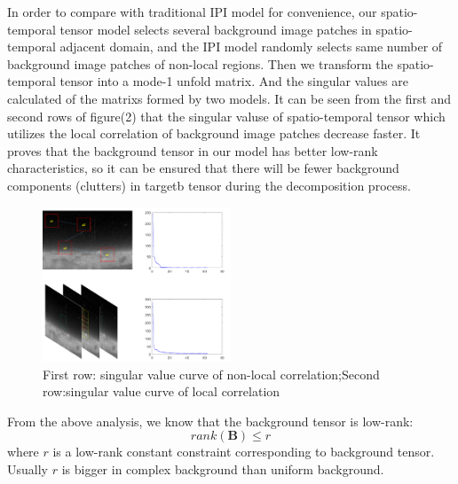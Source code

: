 \documentclass[journal]{IEEEtran}
\begin{document}
In order to compare with traditional IPI model for convenience, our spatio-temporal tensor model selects several background image patches in spatio-temporal adjacent domain, and the IPI model randomly selects same number of background image patches of non-local regions. Then we transform the spatio-temporal tensor into a mode-1 unfold matrix. And the singular values are calculated of the matrixs formed by two models. It can be seen from the first and second rows of figure(2) that the singular valuse of spatio-temporal tensor which utilizes the local correlation of background image patches decrease faster. It proves that the background tensor in our model has better low-rank characteristics, so it can be ensured that there will be fewer background components (clutters) in targetb tensor during the decomposition process.
\begin{figure}[H]
  \centering
  \includegraphics[width=0.5\textwidth]{singular.png}
  \caption{First row: singular value curve of non-local correlation;Second row:singular value curve of local correlation}
  \label{singular}
\end{figure}

From the above analysis, we know that the background tensor is low-rank:
\begin{equation}
  rank(\bm{B}) \leq r
\end{equation}
where $r$ is a low-rank constant constraint corresponding to background tensor. Usually $r$ is bigger in complex background than uniform background.
\end{document}
